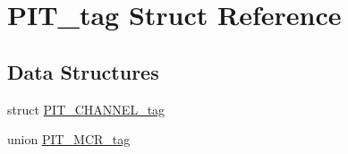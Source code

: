 \hypertarget{structPIT__tag}{}\section{P\+I\+T\+\_\+tag Struct Reference}
\label{structPIT__tag}
\subsection*{Data Structures}
\begin{DoxyCompactItemize}
\item 
struct \mbox{\hyperlink{structPIT__tag_1_1PIT__CHANNEL__tag}{P\+I\+T\+\_\+\+C\+H\+A\+N\+N\+E\+L\+\_\+tag}}
\item 
union \mbox{\hyperlink{unionPIT__tag_1_1PIT__MCR__tag}{P\+I\+T\+\_\+\+M\+C\+R\+\_\+tag}}
\end{DoxyCompactItemize}
